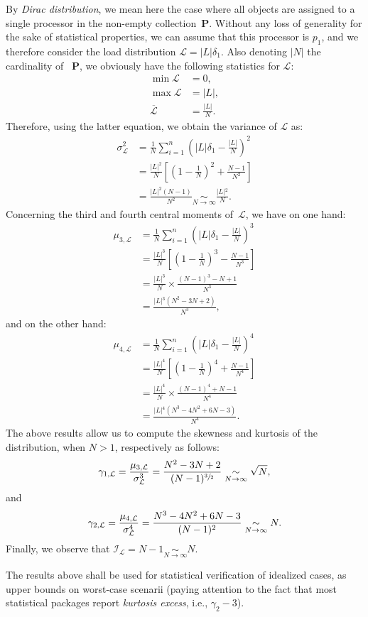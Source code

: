 By \emph{Dirac distribution}, we mean here the case where all objects
are assigned to a single processor in the non-empty
collection~$\mathbf{P}$. Without any loss of generality for the sake
of statistical properties, we can assume that this processor is $p_1$,
and we therefore consider the load distribution
$\mathcal{L}=\vert{L}\vert{}\delta_1$.
Also denoting $\vert{N}\vert$ the cardinality of ~$\mathbf{P}$, we
obviously have the following statistics for $\mathcal{L}$:
\begin{align*}
\min{\mathcal{L}}
&= 0,\\
\max{\mathcal{L}}
&= \vert{L}\vert{},\\
\overline{\mathcal{L}}
&= \frac{\vert{L}\vert{}}{N}.
\end{align*}
Therefore, using the latter equation, we obtain the variance of
$\mathcal{L}$ as:
\begin{align*}
\sigma_{\mathcal{L}}^2
&= \frac{1}{N}\sum_{i=1}^n\left(
\vert{L}\vert{}\delta_1 - \frac{\vert{L}\vert}{N}\right)^2\\
&= \frac{\vert{L}\vert^2}{N}\left[\left(
1 - \frac{1}{N}\right)^2 +\frac{N-1}{N^2}\right]\\
&= \frac{\vert{L}\vert^2(N - 1)}{N^2}
\underset{N\to\infty}{\sim}\frac{\vert{L}\vert{}^2}{N}.
\end{align*}
Concerning the third and fourth central moments of~$\mathcal{L}$, we
have on one hand:
\begin{align*}
\mu_{3,\mathcal{L}}
&= \frac{1}{N}\sum_{i=1}^n\left(
\vert{L}\vert{}\delta_1 - \frac{\vert{L}\vert}{N}\right)^3\\
&= \frac{\vert{L}\vert^3}{N}\left[\left(
1 - \frac{1}{N}\right)^3 - \frac{N-1}{N^3}\right]\\
&= \frac{\vert{L}\vert^3}{N}\times\frac{(N-1)^3 - N + 1}{N^3}\\
&= \frac{\vert{L}\vert{}^3(N^2 - 3N + 2)}{N^3},
\end{align*}
and on the other hand:
\begin{align*}
\mu_{4,\mathcal{L}}
&= \frac{1}{N}\sum_{i=1}^n\left(
\vert{L}\vert{}\delta_1 - \frac{\vert{L}\vert}{N}\right)^4\\
&= \frac{\vert{L}\vert^4}{N}\left[\left(
1 - \frac{1}{N}\right)^4 +\frac{N-1}{N^4}\right]\\
&= \frac{\vert{L}\vert^4}{N}\times\frac{(N - 1)^4 + N - 1}{N^4}\\
&= \frac{\vert{L}\vert{}^4(N^3 - 4N^2 + 6N -3)}{N^4}.
\end{align*}
The above results allow us to compute the skewness and kurtosis of the
distribution, when $N>1$, respectively as follows:
\[
\gamma_{1,\mathcal{L}}
= \frac{\mu_{3,\mathcal{L}}}{\sigma_{\mathcal{L}}^3}\\
= \frac{N^2 - 3N + 2}{(N-1)^{\sfrac{3}{2}}}
\underset{N\to\infty}{\sim}\sqrt{N},
\]
and
\[
\gamma_{2,\mathcal{L}}
= \frac{\mu_{4,\mathcal{L}}}{\sigma_{\mathcal{L}}^4}\\
= \frac{N^3 - 4N^2 + 6N -3}{(N - 1)^2}
\underset{N\to\infty}{\sim}N.
\]
Finally, we observe that 
$\mathcal{I}_{\mathcal{L}}= N-1\underset{N\to\infty}{\sim}N$.

The results above shall be used for statistical verification of
idealized cases, as upper bounds on worst-case scenarii (paying
attention to the fact that most statistical packages report
\emph{kurtosis excess}, i.e., $\gamma_2-3$).

